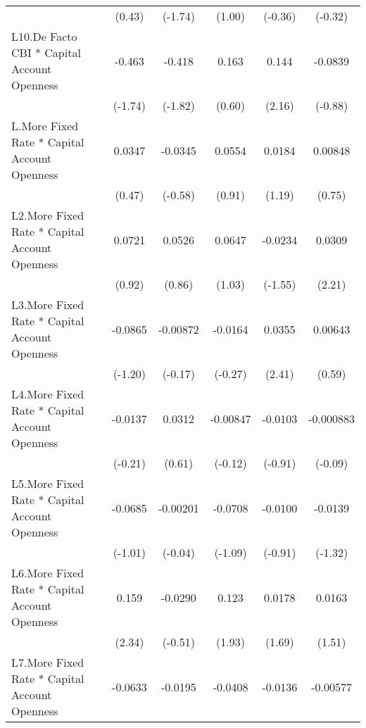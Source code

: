 {\begin{longtable}{l*{5}{c}}
                &   (0.43)         &  (-1.74)         &   (1.00)         &  (-0.36)         &  (-0.32)         \\
[1em]
L10.De Facto CBI * Capital Account Openness&   -0.463         &   -0.418         &    0.163         &    0.144\sym{*}  &  -0.0839         \\
                &  (-1.74)         &  (-1.82)         &   (0.60)         &   (2.16)         &  (-0.88)         \\
[1em]
L.More Fixed Rate * Capital Account Openness&   0.0347         &  -0.0345         &   0.0554         &   0.0184         &  0.00848         \\
                &   (0.47)         &  (-0.58)         &   (0.91)         &   (1.19)         &   (0.75)         \\
[1em]
L2.More Fixed Rate * Capital Account Openness&   0.0721         &   0.0526         &   0.0647         &  -0.0234         &   0.0309\sym{*}  \\
                &   (0.92)         &   (0.86)         &   (1.03)         &  (-1.55)         &   (2.21)         \\
[1em]
L3.More Fixed Rate * Capital Account Openness&  -0.0865         & -0.00872         &  -0.0164         &   0.0355\sym{*}  &  0.00643         \\
                &  (-1.20)         &  (-0.17)         &  (-0.27)         &   (2.41)         &   (0.59)         \\
[1em]
L4.More Fixed Rate * Capital Account Openness&  -0.0137         &   0.0312         & -0.00847         &  -0.0103         &-0.000883         \\
                &  (-0.21)         &   (0.61)         &  (-0.12)         &  (-0.91)         &  (-0.09)         \\
[1em]
L5.More Fixed Rate * Capital Account Openness&  -0.0685         & -0.00201         &  -0.0708         &  -0.0100         &  -0.0139         \\
                &  (-1.01)         &  (-0.04)         &  (-1.09)         &  (-0.91)         &  (-1.32)         \\
[1em]
L6.More Fixed Rate * Capital Account Openness&    0.159\sym{*}  &  -0.0290         &    0.123         &   0.0178         &   0.0163         \\
                &   (2.34)         &  (-0.51)         &   (1.93)         &   (1.69)         &   (1.51)         \\
[1em]
L7.More Fixed Rate * Capital Account Openness&  -0.0633         &  -0.0195         &  -0.0408         &  -0.0136         & -0.00577         \\

\end{longtable}}
